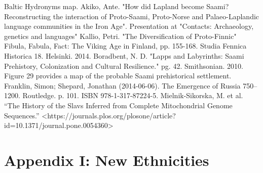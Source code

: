\documentclass{article}
\newcommand{\specificCite}[1]{\tiny #1 \normalsize}
\begin{document}
\begin{thebibliography}{99}
		Baltic Hydronyms map.
		Akiko, Ante. "How did Lapland become Saami? Reconstructing the interaction of Proto-Saami, Proto-Norse and Palaeo-Laplandic language communities in the Iron Age". Presentation at "Contacts: Archaeology, genetics and languages"
		Kallio, Petri. "The Diversification of Proto-Finnic" Fibula, Fabula, Fact: The Viking Age in Finland, pp. 155-168. Studia Fennica Historica 18. Helsinki. 2014.
		Boradbent, N. D. "Lapps and Labyrinths:  Saami Prehistory, Colonization and Cultural Resilience." pg. 42. Smithsonian. 2010. \specificCite{Figure 29 provides a map of the probable Saami prehistorical settlement.}		
		Franklin, Simon; Shepard, Jonathan (2014-06-06). The Emergence of Russia 750–1200. Routledge. p. 101. ISBN 978-1-317-87224-5.
		Mielnik-Sikorska, M. et al. “The History of the Slavs Inferred from Complete Mitochondrial Genome Sequences.” <https://journals.plos.org/plosone/article?id=10.1371/journal.pone.0054360>
	\end{thebibliography}
	
	\newpage
	
	\section{Appendix I: New Ethnicities}
	\label{sec:appendix_new_ethnicities}
	
\end{document}
